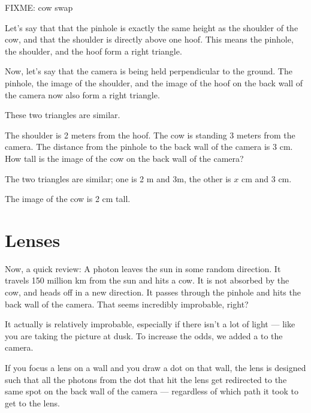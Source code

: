 \begin{Exercise}[title={Height of the image}, label=image_height]

FIXME: cow swap

Let's say that that the pinhole is exactly the same height as the
shoulder of the cow, and that the shoulder is directly above one hoof.
This means the pinhole, the shoulder, and the hoof form a right triangle.

Now, let's say that the camera is being held perpendicular to the
ground.  The pinhole, the image of the shoulder, and the image of
the hoof on the back wall of the camera now also form a right triangle.

These two triangles are similar.

The shoulder is 2 meters from the hoof.  The cow is standing 3 meters
from the camera.  The distance from the pinhole to the back wall of
the camera is 3 cm.  How tall is the image of the cow on the back wall
of the camera?

\end{Exercise}
\begin{Answer}[ref=image_height]

The two triangles are similar; one is 2 m and 3m, the other is $x$ cm and 3 cm.

The image of the cow is 2 cm tall.

\end{Answer}

\section{Lenses}

Now, a quick review: A photon leaves the sun in some random direction. It
travels 150 million km from the sun and hits a cow.  It is not
absorbed by the cow, and heads off in a new direction.  It passes
through the pinhole and hits the back wall of the camera.  That seems
incredibly improbable, right?

It actually is relatively improbable, especially if there isn't a lot of
light --- like you are taking the picture at dusk.  To increase the
odds, we added a  to the camera.

If you focus a lens on a wall and you draw a dot on that
wall, the lens is designed such that all the photons from the dot that
hit the lens get redirected to the same spot on the back wall of the
camera --- regardless of which path it took to get to the lens.

